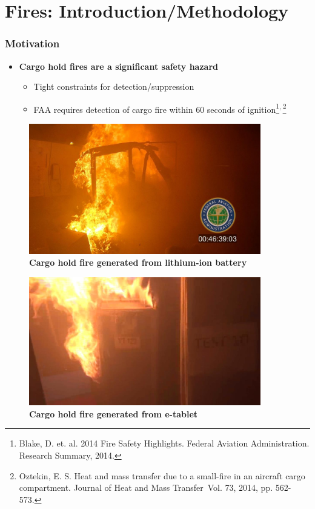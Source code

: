\documentclass[9pt]{beamer}
\begin{document}
\section{Fires: Introduction/Methodology}
\label{sec-4}
\begin{frame}
\frametitle{Motivation}
\label{sec-4-1}

\begin{itemize}
\item \textbf{Cargo hold fires are a significant safety hazard}
\begin{itemize}
\item Tight constraints for detection/suppression
\item FAA requires detection of cargo fire within 60 seconds of ignition\footnote{Blake, D. et. al. 2014 Fire Safety Highlights. Federal
Aviation Administration. Research Summary, 2014.
 }\textsuperscript{,}\,\footnote{Oztekin, E. S. Heat and mass transfer due to a small-fire in
an aircraft cargo compartment. \International Journal of Heat and Mass
Transfer\, Vol. 73, 2014, pp. 562-573.
 }
\end{itemize}
\end{itemize}
\centering
\begin{minipage}[b]{0.45\linewidth}
\begin{figure}[ht]
\includegraphics[width=0.9\textwidth]{CargoHoldFire1.png} \\
\textbf{Cargo hold fire generated from lithium-ion battery}
\end{figure}
\end{minipage}
\begin{minipage}[b]{0.45\linewidth}
\begin{figure}[ht]
\includegraphics[width=0.9\textwidth]{CargoHoldFire2.png} \\
\textbf{Cargo hold fire generated from e-tablet}
\end{figure}
\end{minipage}
\end{frame}
\end{document}
